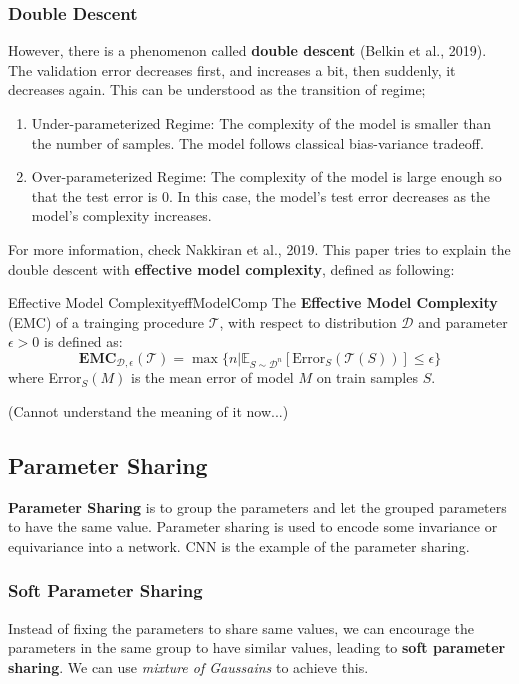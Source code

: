 \documentclass{article}
\begin{document}
        \subsubsection{Double Descent}
            However, there is a phenomenon called \textbf{double descent} (Belkin et al., 2019). The validation error decreases first,
            and increases a bit, then suddenly, it decreases again. This can be understood as the transition of regime;
            \begin{enumerate}
                \item Under-parameterized Regime: The complexity of the model is smaller than the number of samples.
                    The model follows classical bias-variance tradeoff.
                \item Over-parameterized Regime: The complexity of the model is large enough so that the test error is 0.
                    In this case, the model's test error decreases as the model's complexity increases.
            \end{enumerate}
            For more information, check Nakkiran et al., 2019. This paper tries to explain the double descent with \textbf{effective model complexity},
            defined as following:
            \begin{defn}{Effective Model Complexity}{effModelComp}
                The \textbf{Effective Model Complexity} (EMC) of a trainging procedure $\mathcal{T}$,
                with respect to distribution $\mathcal{D}$ and parameter $\epsilon > 0$ is defined as:
                \[
                \textbf{EMC}_{\mathcal{D},\epsilon}(\mathcal{T})=
                \max{\{n|\mathbb{E}_{S\sim\mathcal{D}^n}[\text{Error}_S(\mathcal{T}(S))] \leq \epsilon\}}
                \]
                where Error$_S(M)$ is the mean error of model $M$ on train samples $S$.
            \end{defn}
            (Cannot understand the meaning of it now...)

        
    \subsection{Parameter Sharing}
        \textbf{Parameter Sharing} is to group the parameters and let the grouped parameters to have the same value.
        Parameter sharing is used to encode some invariance or equivariance into a network. CNN is the example of the parameter sharing.

        \subsubsection{Soft Parameter Sharing}
            Instead of fixing the parameters to share same values, we can encourage the parameters in the same group to have
            similar values, leading to \textbf{soft parameter sharing}. We can use \emph{mixture of Gaussains} to achieve this.
\end{document}
